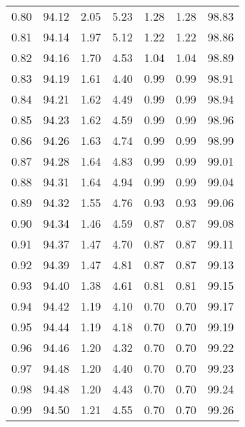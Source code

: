 \begin{tabular}{|c|c|c|c|c|c|c|}
      0.80 &     94.12 &      2.05 &       5.23 &    1.28 &       1.28 &         98.83 \\
      0.81 &     94.14 &      1.97 &       5.12 &    1.22 &       1.22 &         98.86 \\
      0.82 &     94.16 &      1.70 &       4.53 &    1.04 &       1.04 &         98.89 \\
      0.83 &     94.19 &      1.61 &       4.40 &    0.99 &       0.99 &         98.91 \\
      0.84 &     94.21 &      1.62 &       4.49 &    0.99 &       0.99 &         98.94 \\
      0.85 &     94.23 &      1.62 &       4.59 &    0.99 &       0.99 &         98.96 \\
      0.86 &     94.26 &      1.63 &       4.74 &    0.99 &       0.99 &         98.99 \\
      0.87 &     94.28 &      1.64 &       4.83 &    0.99 &       0.99 &         99.01 \\
      0.88 &     94.31 &      1.64 &       4.94 &    0.99 &       0.99 &         99.04 \\
      0.89 &     94.32 &      1.55 &       4.76 &    0.93 &       0.93 &         99.06 \\
      0.90 &     94.34 &      1.46 &       4.59 &    0.87 &       0.87 &         99.08 \\
      0.91 &     94.37 &      1.47 &       4.70 &    0.87 &       0.87 &         99.11 \\
      0.92 &     94.39 &      1.47 &       4.81 &    0.87 &       0.87 &         99.13 \\
      0.93 &     94.40 &      1.38 &       4.61 &    0.81 &       0.81 &         99.15 \\
      0.94 &     94.42 &      1.19 &       4.10 &    0.70 &       0.70 &         99.17 \\
      0.95 &     94.44 &      1.19 &       4.18 &    0.70 &       0.70 &         99.19 \\
      0.96 &     94.46 &      1.20 &       4.32 &    0.70 &       0.70 &         99.22 \\
      0.97 &     94.48 &      1.20 &       4.40 &    0.70 &       0.70 &         99.23 \\
      0.98 &     94.48 &      1.20 &       4.43 &    0.70 &       0.70 &         99.24 \\
      0.99 &     94.50 &      1.21 &       4.55 &    0.70 &       0.70 &         99.26 \\
\bottomrule
\end{tabular}
